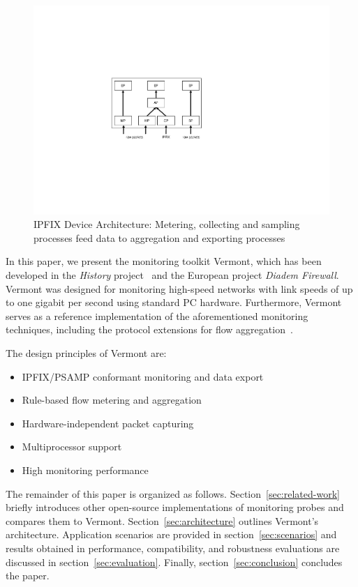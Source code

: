 \begin{figure}
\begin{center}
\includegraphics[scale=0.55]{gfx/ipfix-arch2.pdf}
\caption{IPFIX Device Architecture: Metering, collecting and sampling processes feed data to aggregation and exporting processes}
\label{fig_ipfix_arch}
\end{center}
\end{figure}


In this paper, we present the monitoring toolkit Vermont, which has been developed in the \emph{History} project~\cite{dressler2005history} and the European project \emph{Diadem Firewall}.
Vermont was designed for monitoring high-speed networks with link speeds of up to one gigabit per second using standard PC hardware.
Furthermore, Vermont serves as a reference implementation of the aforementioned monitoring techniques, including the protocol extensions for flow aggregation~\cite{dressler-ipfix-aggregation}.

The design principles of Vermont are:
\begin{itemize}
\item IPFIX/PSAMP conformant monitoring and data export
\item Rule-based flow metering and aggregation
\item Hardware-independent packet capturing
\item Multiprocessor support
\item High monitoring performance
\end{itemize}

The remainder of this paper is organized as follows.
Section~\ref{sec:related-work} briefly introduces other open-source implementations of monitoring probes and compares them to Vermont.
Section~\ref{sec:architecture} outlines Vermont's architecture.
Application scenarios are provided in section~\ref{sec:scenarios} and results obtained in performance, compatibility, and robustness evaluations are discussed in section~\ref{sec:evaluation}.
Finally, section~\ref{sec:conclusion} concludes the paper.

